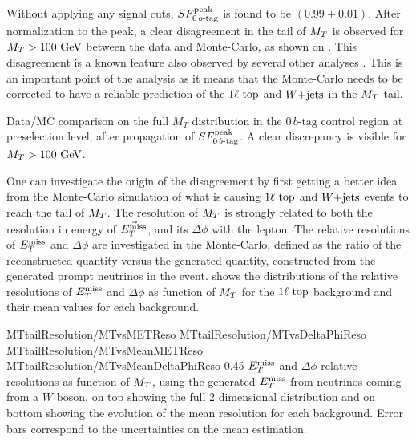     Without applying any signal cuts, $SF_{0\, b\text{-tag}}^{\text{peak}}$ is found to be $(0.99 \pm 0.01)$.
    After normalization to the peak, a clear disagreement in the tail of $M_T$ is observed
    for $M_T > 100 ~\text{GeV}$ between the data and Monte-Carlo, as shown on
    . This disagreement is a known feature
    also observed by several other analyses \cite{WjetsDifferentialCrossSection, LeptonicMonotop,
    B2GttMET}. This is an important point of the analysis as
    it means that the Monte-Carlo needs to be corrected to have a reliable prediction of
    the $1\ell~\text{top}$ and $\text{$W$+jets}$ in the $M_T$ tail.

                 {Data/MC comparison on the full $M_T$ distribution in the $0\, b\text{-tag}$ control
                 region at preselection level, after propagation of $SF_{0\, b\text{-tag}}^{\text{peak}}$. A clear
                 discrepancy is visible for $M_T > 100 ~\text{GeV}$.}

    One can investigate the origin of the disagreement by first getting a better idea from
    the Monte-Carlo simulation of what is causing $1\ell~\text{top}$ and $\text{$W$+jets}$ events
    to reach the tail of $M_T$. The resolution of $M_T$ is strongly related to both the
    resolution in energy of $\vec{E_T^\text{miss}}$, and its $\Delta\phi$ with the lepton. The relative
    resolutions of $E_T^\text{miss}$ and $\Delta \phi$ are investigated in the Monte-Carlo, defined
    as the ratio of the reconstructed quantity versus the generated quantity, constructed
    from the generated prompt neutrinos in the event.  shows
    the distributions of the relative resolutions of $E_T^\text{miss}$ and $\Delta \phi$ as function
    of $M_T$ for the $1\ell~\text{top}$ background and their mean values for each background.

                      {MTtailResolution/MTvsMETReso}
                      {MTtailResolution/MTvsDeltaPhiReso}
                      {MTtailResolution/MTvsMeanMETReso}
                      {MTtailResolution/MTvsMeanDeltaPhiReso}
                      {0.45}
                      {$E_T^\text{miss}$ and $\Delta \phi$ relative resolutions as function of $M_T$,
                      using the generated $E_T^\text{miss}$ from neutrinos coming from a $W$ boson, on top
                      showing the full 2 dimensional distribution and on bottom showing
                      the evolution of the mean resolution for each background. Error
                      bars correspond to the uncertainties on the mean estimation.}

